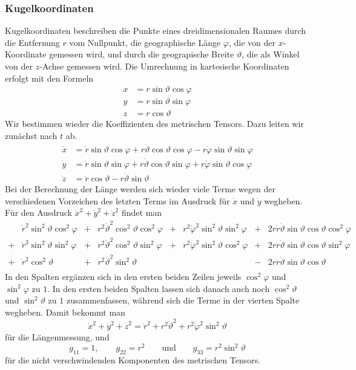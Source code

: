\subsubsection{Kugelkoordinaten}
Kugelkoordinaten beschreiben die Punkte eines dreidimensionalen Raumes
durch die Entfernung $r$ vom Nullpunkt, die geographische Länge
$\varphi$, die von
der $x$-Koordinate gemessen wird, und durch die geograpische Breite
$\vartheta$,
die als Winkel von der $z$-Achse gemessen wird.
Die Umrechnung in kartesische Koordinaten erfolgt mit den Formeln
\begin{align*}
x&= r\sin\vartheta\cos\varphi\\
y&= r\sin\vartheta\sin\varphi\\
z&= r\cos\vartheta
\end{align*}
Wir bestimmen wieder die Koeffizienten des metrischen Tensors.
Dazu leiten wir zunächst nach $t$ ab.
\begin{align*}
\dot x
&=
\dot r\sin\vartheta\cos\varphi
+
r\dot\vartheta \cos\vartheta\cos\varphi
-
r\dot\varphi \sin\vartheta\sin\varphi
\\
\dot y
&=
\dot r\sin\vartheta\sin\varphi
+
r\dot\vartheta\cos\vartheta\sin\varphi
+
r\dot\varphi\sin\vartheta\cos\varphi
\\
\dot z
&=
\dot r\cos\vartheta
-
r\dot\vartheta \sin\vartheta
\end{align*}
Bei der Berechnung der Länge werden sich wieder viele Terme
wegen der verschiedenen Vorzeichen des letzten Terms im
Ausdruck für $\dot x$ und $\dot y$ wegheben.
Für den Ausdruck $ \dot x^2 + \dot y^2 + \dot z^2$ findet man
\[
\begin{array}{clclclcl}
 &
\dot r^2\sin^2\vartheta\cos^2\varphi
	&+&r^2\dot\vartheta^2\cos^2\vartheta\cos^2\varphi
		&+&r^2\dot\varphi^2\sin^2\vartheta\sin^2\varphi
			&+&2r\dot r\dot\vartheta\sin\vartheta\cos\vartheta\cos^2\varphi
\\
+&
\dot r^2\sin^2\vartheta\sin^2\varphi
	&+&r^2\dot\vartheta^2\cos^2\vartheta\sin^2\varphi
		&+&r^2\dot\varphi^2\sin^2\vartheta\cos^2\varphi
			&+&2r\dot r\dot\vartheta\sin\vartheta\cos\vartheta\sin^2\varphi
\\
+&
\dot r^2\cos^2\vartheta
	&+&r^2\dot\vartheta^2\sin^2\vartheta
		& &
			&-&2r\dot r\dot\vartheta \sin\vartheta \cos\vartheta
\\
\end{array}
\]
In den Spalten ergänzen sich in den ersten beiden Zeilen jeweils
$\cos^2\varphi$ und $\sin^2\varphi$ zu $1$.
In den ersten beiden Spalten lassen sich danach auch noch
$\cos^2\vartheta$ und $\sin^2\vartheta$ zu $1$ zusammenfassen,
während sich die Terme in der vierten Spalte wegheben.
Damit bekommt man
\begin{equation}
\dot x^2 + \dot y^2 + \dot z^2
=
\dot r^2+r^2\dot\vartheta^2 + r^2\dot\varphi^2\sin^2\vartheta
\label{skript:kruemmung:kugelkoordinaten}
\end{equation}
für die Längenmessung, und
\[
g_{11}=1,\qquad
g_{22}=r^2
\qquad\text{und}\qquad
g_{33}= r^2\sin^2\vartheta
\]
für die nicht verschwindenden Komponenten des metrischen Tensors.

